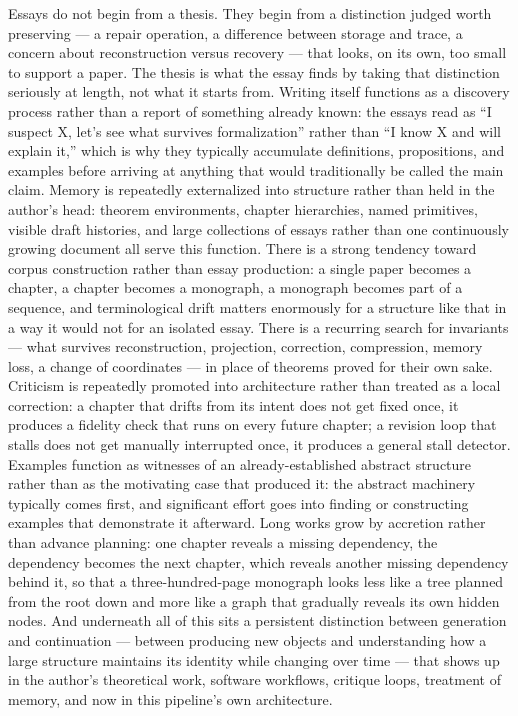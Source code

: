 \documentclass[11pt]{article}
\theoremstyle{definition}
\begin{document}
Essays do not begin from a thesis. They begin from a distinction judged
worth preserving --- a repair operation, a difference between storage
and trace, a concern about reconstruction versus recovery --- that
looks, on its own, too small to support a paper. The thesis is what the
essay finds by taking that distinction seriously at length, not what it
starts from. Writing itself functions as a discovery process rather
than a report of something already known: the essays read as ``I
suspect X, let's see what survives formalization'' rather than ``I know
X and will explain it,'' which is why they typically accumulate
definitions, propositions, and examples before arriving at anything
that would traditionally be called the main claim. Memory is repeatedly
externalized into structure rather than held in the author's head:
theorem environments, chapter hierarchies, named primitives, visible
draft histories, and large collections of essays rather than one
continuously growing document all serve this function. There is a
strong tendency toward corpus construction rather than essay
production: a single paper becomes a chapter, a chapter becomes a
monograph, a monograph becomes part of a sequence, and terminological
drift matters enormously for a structure like that in a way it would
not for an isolated essay. There is a recurring search for invariants
--- what survives reconstruction, projection, correction, compression,
memory loss, a change of coordinates --- in place of theorems proved
for their own sake. Criticism is repeatedly promoted into architecture
rather than treated as a local correction: a chapter that drifts from
its intent does not get fixed once, it produces a fidelity check that
runs on every future chapter; a revision loop that stalls does not get
manually interrupted once, it produces a general stall detector.
Examples function as witnesses of an already-established abstract
structure rather than as the motivating case that produced it: the
abstract machinery typically comes first, and significant effort goes
into finding or constructing examples that demonstrate it afterward.
Long works grow by accretion rather than advance planning: one chapter
reveals a missing dependency, the dependency becomes the next chapter,
which reveals another missing dependency behind it, so that a
three-hundred-page monograph looks less like a tree planned from the
root down and more like a graph that gradually reveals its own hidden
nodes. And underneath all of this sits a persistent distinction between
generation and continuation --- between producing new objects and
understanding how a large structure maintains its identity while
changing over time --- that shows up in the author's theoretical work,
software workflows, critique loops, treatment of memory, and now in
this pipeline's own architecture.
\end{document}
